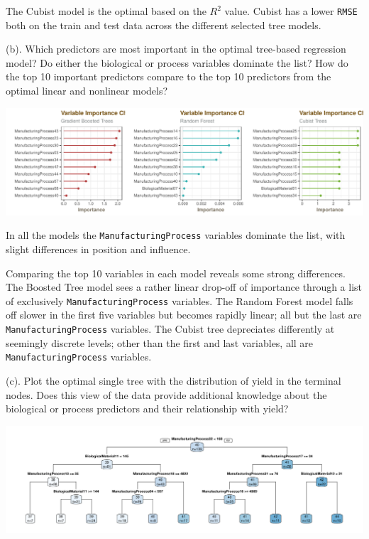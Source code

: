 \documentclass[]{report}
\begin{document}
The Cubist model is the optimal based on the \(R^2\) value. Cubist has a
lower \texttt{RMSE} both on the train and test data across the different
selected tree models.

\begin{subquestion}{(b).} Which predictors are most important in the optimal tree-based regression model? Do either the biological or process variables dominate the list? How do the top 10 important predictors compare to the top 10 predictors from the optimal linear and nonlinear models?\end{subquestion}

\includegraphics{AppliedPredictiveModeling_treebased_regression_files/figure-latex/kj-8.7b-1.pdf}

In all the models the \texttt{ManufacturingProcess} variables dominate
the list, with slight differences in position and influence.

Comparing the top 10 variables in each model reveals some strong
differences. The Boosted Tree model sees a rather linear drop-off of
importance through a list of exclusively \texttt{ManufacturingProcess}
variables. The Random Forest model falls off slower in the first five
variables but becomes rapidly linear; all but the last are
\texttt{ManufacturingProcess} variables. The Cubist tree depreciates
differently at seemingly discrete levels; other than the first and last
variables, all are \texttt{ManufacturingProcess} variables.

\begin{subquestion}{(c).} Plot the optimal single tree with the distribution of yield in the terminal nodes. Does this view of the data provide additional knowledge about the biological or process predictors and their relationship with yield?\end{subquestion}

\includegraphics{AppliedPredictiveModeling_treebased_regression_files/figure-latex/kj-8.7c-1.pdf}
\end{document}

